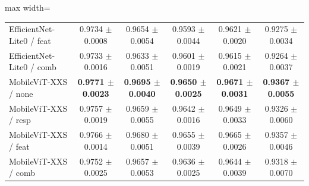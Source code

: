 \begin{table}[ht]
\begin{adjustbox}{max width=\textwidth}
\begin{tabular}{lccccc}
EfficientNet-Lite0 / feat          & 0.9734 $\pm$ 0.0008      & 0.9654 $\pm$ 0.0054      & 0.9593 $\pm$ 0.0044      & 0.9621 $\pm$ 0.0020      & 0.9275 $\pm$ 0.0034      \\
EfficientNet-Lite0 / comb          & 0.9733 $\pm$ 0.0016      & 0.9633 $\pm$ 0.0051      & 0.9601 $\pm$ 0.0019      & 0.9615 $\pm$ 0.0021      & 0.9264 $\pm$ 0.0037      \\
\midrule
MobileViT-XXS / none               & \textbf{0.9771 $\pm$ 0.0023} & \textbf{0.9695 $\pm$ 0.0040} & \textbf{0.9650 $\pm$ 0.0025} & \textbf{0.9671 $\pm$ 0.0031} & \textbf{0.9367 $\pm$ 0.0055} \\
MobileViT-XXS / resp               & 0.9757 $\pm$ 0.0019      & 0.9659 $\pm$ 0.0055      & 0.9642 $\pm$ 0.0016      & 0.9649 $\pm$ 0.0033      & 0.9326 $\pm$ 0.0060      \\
MobileViT-XXS / feat               & 0.9766 $\pm$ 0.0014      & 0.9680 $\pm$ 0.0051      & 0.9655 $\pm$ 0.0039      & 0.9665 $\pm$ 0.0026      & 0.9357 $\pm$ 0.0046      \\
MobileViT-XXS / comb               & 0.9752 $\pm$ 0.0025      & 0.9657 $\pm$ 0.0053      & 0.9636 $\pm$ 0.0025      & 0.9644 $\pm$ 0.0039      & 0.9318 $\pm$ 0.0070      \\
\bottomrule
\end{tabular}
\end{adjustbox}
\end{table}
